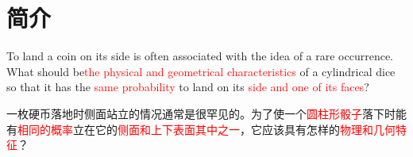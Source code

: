 \documentclass[UTF8]{gapd}
\begin{document}
\maketitle


\section{简介}
\label{sec:Introduction}
To land a coin on its side is often associated with the idea of a rare occurrence. What should be\textcolor{red}{the physical and geometrical characteristics} of a cylindrical dice so that it has the \textcolor{red}{same probability} to land on its \textcolor{red}{side and one of its faces}?

一枚硬币落地时侧面站立的情况通常是很罕见的。为了使一个\textcolor{red}{圆柱形骰子}落下时能有\textcolor{red}{相同的概率}立在它的\textcolor{red}{侧面和上下表面其中之一}，它应该具有怎样的\textcolor{red}{物理和几何特征}？

%

\end{document}
